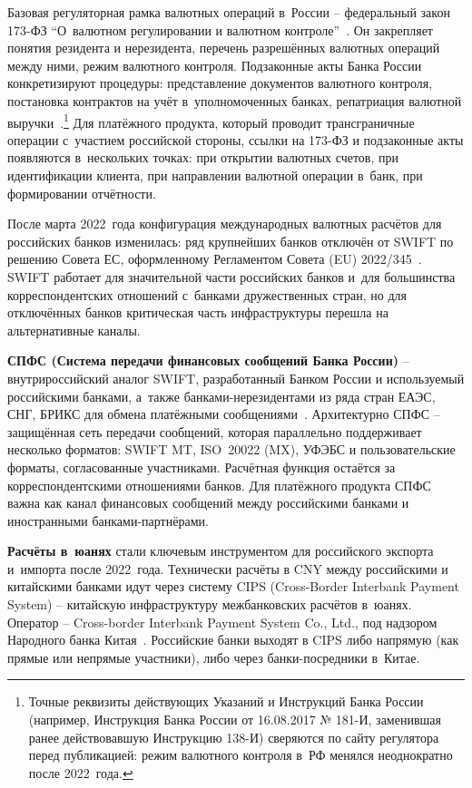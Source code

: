 Базовая регуляторная рамка валютных операций в~России --
федеральный закон 173-ФЗ \enquote{О~валютном регулировании
и валютном контроле}~\cite{fz-173}. Он закрепляет понятия
резидента и нерезидента, перечень разрешённых валютных
операций между ними, режим валютного контроля. Подзаконные
акты Банка России конкретизируют процедуры: представление
документов валютного контроля, постановка контрактов
на учёт в~уполномоченных банках, репатриация валютной
выручки~\cite{cbr-181i}.\footnote{Точные реквизиты
действующих Указаний и Инструкций Банка России (например,
Инструкция Банка России от 16.08.2017 № 181-И, заменившая ранее действовавшую Инструкцию 138-И)
сверяются по сайту регулятора перед публикацией: режим
валютного контроля в~РФ менялся неоднократно после 2022~года.}
Для платёжного продукта, который проводит трансграничные
операции с~участием российской стороны, ссылки на 173-ФЗ
и подзаконные акты появляются в~нескольких точках: при
открытии валютных счетов, при идентификации клиента, при
направлении валютной операции в~банк, при формировании
отчётности.

После марта 2022~года конфигурация международных валютных
расчётов для российских банков изменилась: ряд крупнейших
банков отключён от SWIFT по решению Совета ЕС, оформленному
Регламентом Совета (EU) 2022/345~\cite{eu-swift-russia-2022,ofac-russia-sanctions}.
SWIFT работает для значительной части российских банков
и~для большинства корреспондентских отношений с~банками
дружественных стран, но для отключённых банков критическая
часть инфраструктуры перешла на альтернативные каналы.

\textbf{СПФС (Система передачи финансовых сообщений Банка
России)} -- внутрироссийский аналог SWIFT, разработанный
Банком России и используемый российскими банками, а~также
банками-нерезидентами из ряда стран ЕАЭС, СНГ, БРИКС
для обмена платёжными сообщениями~\cite{cbr-spfs}. Архитектурно
СПФС -- защищённая сеть передачи сообщений, которая
параллельно поддерживает несколько форматов: SWIFT MT,
ISO~20022 (MX), УФЭБС и пользовательские форматы,
согласованные участниками. Расчётная функция остаётся
за корреспондентскими отношениями банков. Для платёжного
продукта СПФС важна как канал финансовых сообщений между
российскими банками и иностранными банками-партнёрами.

\textbf{Расчёты в~юанях} стали ключевым инструментом
для российского экспорта и~импорта после 2022~года.
Технически расчёты в CNY между российскими и китайскими
банками идут через систему CIPS (Cross-Border Interbank
Payment System) -- китайскую инфраструктуру межбанковских
расчётов в~юанях. Оператор -- Cross-border Interbank Payment
System Co., Ltd., под надзором Народного банка
Китая~\cite{cips-overview}. Российские банки
выходят в CIPS либо напрямую (как прямые или непрямые участники),
либо через банки-посредники в~Китае.

